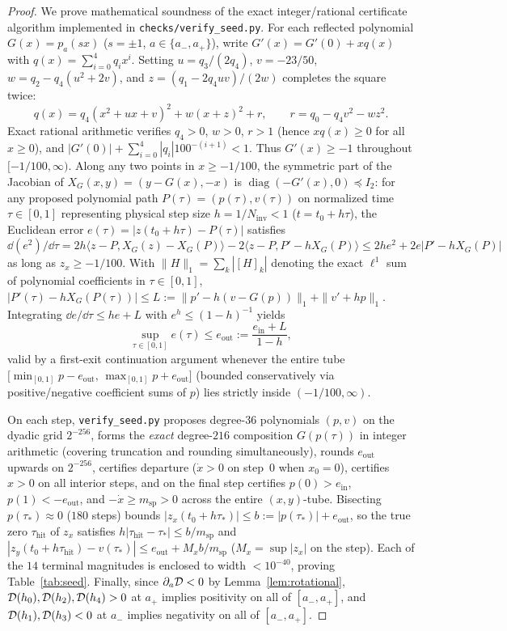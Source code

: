 \begin{proof}
We prove mathematical soundness of the exact integer/rational certificate algorithm implemented in \texttt{checks/verify\_seed.py}. For each reflected polynomial $G(x)=p_a(sx)$ ($s=\pm 1$, $a\in\{a_-,a_+\}$), write $G'(x)=G'(0)+xq(x)$ with $q(x)=\sum_{i=0}^4 q_i x^i$. Setting $u=q_3/(2q_4)$, $v=-23/50$, $w=q_2-q_4(u^2+2v)$, and $z=(q_1-2q_4 uv)/(2w)$ completes the square twice:
\[
  q(x) = q_4(x^2+ux+v)^2 + w(x+z)^2 + r,\qquad r = q_0 - q_4 v^2 - w z^2.
\]
Exact rational arithmetic verifies $q_4>0$, $w>0$, $r>1$ (hence $xq(x)\ge 0$ for all $x\ge 0$), and $|G'(0)|+\sum_{i=0}^4|q_i|100^{-(i+1)}<1$. Thus $G'(x)\ge -1$ throughout $[-1/100,\infty)$. Along any two points in $x\ge -1/100$, the symmetric part of the Jacobian of $X_G(x,y)=(y-G(x),-x)$ is $\operatorname{diag}(-G'(x),0)\preceq I_2$: for any proposed polynomial path $P(\tau)=(p(\tau),v(\tau))$ on normalized time $\tau\in[0,1]$ representing physical step size $h=1/N_{\mathrm{inv}}<1$ ($t=t_0+h\tau$), the Euclidean error $e(\tau)=|z(t_0+h\tau)-P(\tau)|$ satisfies $\dd(e^2)/\dd\tau=2h\langle z-P,X_G(z)-X_G(P)\rangle-2\langle z-P,P'-hX_G(P)\rangle\le 2he^2+2e|P'-hX_G(P)|$ as long as $z_x\ge -1/100$. With $\|H\|_1=\sum_k|[H]_k|$ denoting the exact $\ell^1$ sum of polynomial coefficients in $\tau\in[0,1]$, $|P'(\tau)-hX_G(P(\tau))|\le L:=\|p'-h(v-G(p))\|_1+\|v'+hp\|_1$. Integrating $\dd e/\dd\tau\le he+L$ with $e^h\le(1-h)^{-1}$ yields
\[
  \sup_{\tau\in[0,1]} e(\tau) \le e_{\mathrm{out}} := \frac{e_{\mathrm{in}}+L}{1-h},
\]
valid by a first-exit continuation argument whenever the entire tube $\big[\min_{[0,1]}p-e_{\mathrm{out}},\,\max_{[0,1]}p+e_{\mathrm{out}}\big]$ (bounded conservatively via positive/negative coefficient sums of $p$) lies strictly inside $(-1/100,\infty)$.

On each step, \texttt{verify\_seed.py} proposes degree-$36$ polynomials $(p,v)$ on the dyadic grid $2^{-256}$, forms the \emph{exact} degree-$216$ composition $G(p(\tau))$ in integer arithmetic (covering truncation and rounding simultaneously), rounds $e_{\mathrm{out}}$ upwards on $2^{-256}$, certifies departure ($\dot x>0$ on step~$0$ when $x_0=0$), certifies $x>0$ on all interior steps, and on the final step certifies $p(0)>e_{\mathrm{in}}$, $p(1)<-e_{\mathrm{out}}$, and $-\dot x\ge m_{\mathrm{sp}}>0$ across the entire $(x,y)$-tube. Bisecting $p(\tau_*)\approx 0$ ($180$ steps) bounds $|z_x(t_0+h\tau_*)|\le b:=|p(\tau_*)|+e_{\mathrm{out}}$, so the true zero $\tau_{\mathrm{hit}}$ of $z_x$ satisfies $h|\tau_{\mathrm{hit}}-\tau_*|\le b/m_{\mathrm{sp}}$ and $|z_y(t_0+h\tau_{\mathrm{hit}})-v(\tau_*)|\le e_{\mathrm{out}}+M_x b/m_{\mathrm{sp}}$ ($M_x=\sup|z_x|$ on the step). Each of the $14$ terminal magnitudes is enclosed to width $<10^{-40}$, proving Table~\ref{tab:seed}. Finally, since $\partial_a\mathcal{D}<0$ by Lemma~\ref{lem:rotational}, $\mathcal{D}(h_0),\mathcal{D}(h_2),\mathcal{D}(h_4)>0$ at $a_+$ implies positivity on all of $[a_-,a_+]$, and $\mathcal{D}(h_1),\mathcal{D}(h_3)<0$ at $a_-$ implies negativity on all of $[a_-,a_+]$.
\end{proof}

